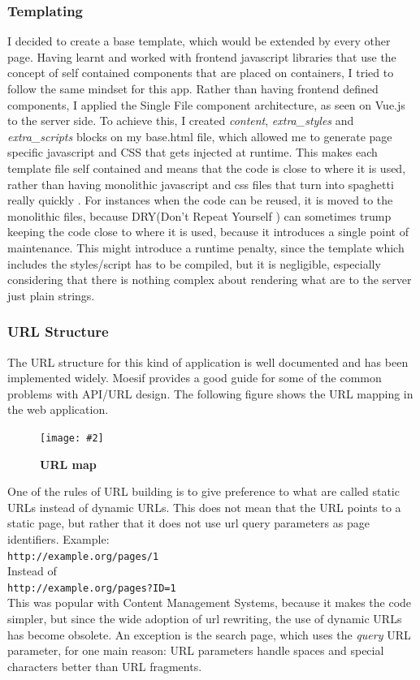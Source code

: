 \documentclass[10pt, a4paper]{article}
\newcommand{\figuremacro}[5]{
    \begin{figure}[#1]
        \centering
        \texttt{[image: \#2]}
        \caption[#3]{\textbf{#3}#4}
        \label{fig:#2}
    \end{figure}
}
\begin{document}
    \subsubsection{Templating}
    I decided to create a base template, which would be extended by every other page. Having learnt and worked with frontend javascript libraries that use the concept of self contained components that are placed on containers\cite{abramov_presentational_2015}, I tried to follow the same mindset for this app.
    Rather than having frontend defined components, I applied the Single File component architecture, as seen on Vue.js \cite{Vue.js} to the server side.
    To achieve this, I created \textit{content}, \textit{extra\_styles} and \textit{extra\_scripts} blocks on my base.html file, which allowed me to generate page specific javascript and CSS that gets injected at runtime. This makes each template file self contained and means that the code is close to where it is used, rather than having monolithic javascript and css files that turn into spaghetti really quickly \cite{conway1978a}. For instances when the code can be reused, it is moved to the monolithic files, because DRY(Don't Repeat Yourself \cite{hunt2000the}) can sometimes trump keeping the code close to where it is used, because it introduces a single point of maintenance.
    This might introduce a runtime penalty, since the template which includes the styles/script has to be compiled, but it is negligible, especially considering that there is nothing complex about rendering what are to the server just plain strings.
    
    \subsubsection{URL Structure}
    The URL structure for this kind of application is well documented and has been implemented widely. Moesif\cite{Moesif} provides a good guide for some of the common problems with API/URL design.
    The following figure shows the URL mapping in the web application.
    
    \figuremacro{h}{url-map}{URL map}{}{1.0}
	
	One of the rules of URL building is to give preference to what are called static URLs instead of dynamic URLs. This does not mean that the URL points to a static page, but rather that it does not use url query parameters as page identifiers. Example:\\
	\texttt{http://example.org/pages/1}\\
	Instead of\\
	\texttt{http://example.org/pages?ID=1}\\
	 This was popular with Content Management Systems, because it makes the code simpler, but since the wide adoption of url rewriting, the use of dynamic URLs has become obsolete.
	 An exception is the search page, which uses the \textit{query} URL parameter, for one main reason: URL parameters handle spaces and special characters better than URL fragments.
	 
\end{document}
